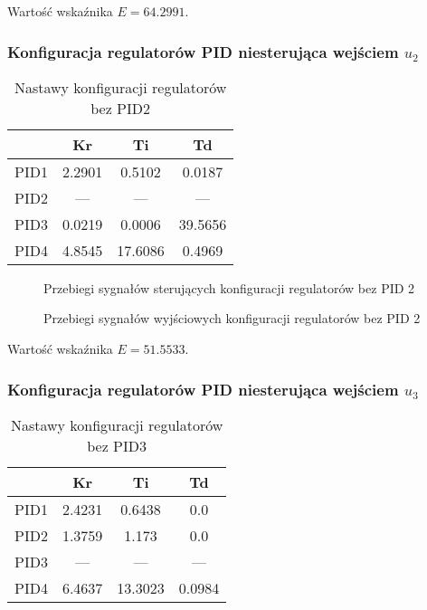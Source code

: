 Wartość wskaźnika $E=\num{64.2991}$.

\newpage
\subsubsection{Konfiguracja regulatorów PID niesterująca wejściem $u_{2}$}

\begin{table}[H]
    \centering
    \begin{tabular}{|l|c|c|c|}
    \hline
         & Kr  & Ti  & Td  \\ \hline
    PID1 & 2.2901 & 0.5102 & 0.0187 \\ \hline
    PID2 & --- & --- & --- \\ \hline
    PID3 & 0.0219 & 0.0006 & 39.5656 \\ \hline
    PID4 & 4.8545 & 17.6086 & 0.4969 \\ \hline
    \end{tabular}
    \caption[H]{Nastawy konfiguracji regulatorów bez PID2}
\end{table}


\ifdefined\CompileFigures
\begin{figure}[H] 
    \centering
    
    \caption{Przebiegi sygnałów sterujących konfiguracji regulatorów bez PID 2}
    \label{projekt:zad5:figure:projzadanie5PIDbezu2u}
\end{figure}
\fi

\ifdefined\CompileFigures
\begin{figure}[H] 
    \centering
    
    \caption{Przebiegi sygnałów wyjściowych konfiguracji regulatorów bez PID 2}
    \label{projekt:zad5:figure:projzadanie5PIDbezu2y}
\end{figure}
\fi

Wartość wskaźnika $E=\num{51.5533}$.

\newpage
\subsubsection{Konfiguracja regulatorów PID niesterująca wejściem $u_{3}$}

\begin{table}[H]
    \centering
    \begin{tabular}{|l|c|c|c|}
    \hline
         & Kr  & Ti  & Td  \\ \hline
    PID1 & 2.4231 & 0.6438 & 0.0 \\ \hline
    PID2 & 1.3759 & 1.173 & 0.0 \\ \hline
    PID3 & --- & --- & --- \\ \hline
    PID4 & 6.4637 & 13.3023 & 0.0984 \\ \hline
    \end{tabular}
    \caption[H]{Nastawy konfiguracji regulatorów bez PID3}
\end{table}

